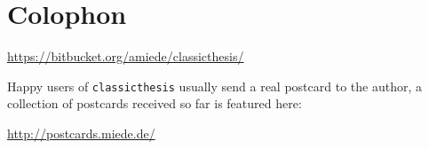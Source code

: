 
\pagestyle{empty}

\hfill

\vfill


\section*{Colophon}


\begin{center}
\url{https://bitbucket.org/amiede/classicthesis/}
\end{center}

\noindent Happy users of \texttt{classicthesis} usually send a real postcard to the author, a collection of postcards received so far is featured here: 

\begin{center}
\url{http://postcards.miede.de/}
\end{center}
 
\bigskip

\noindent\finalVersionString